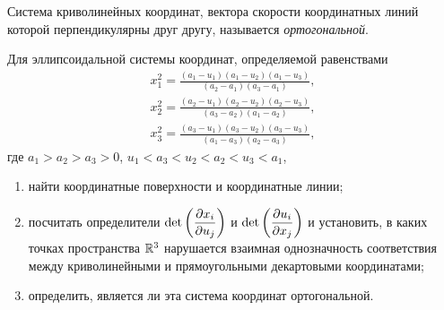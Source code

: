 \begin{definition}
	Система криволинейных координат, вектора скорости координатных линий которой перпендикулярны друг другу, называется \textit{ортогональной}.
\end{definition}

\begin{problem}
	Для эллипсоидальной системы координат, определяемой равенствами
	\begin{gather*}
		x_1^2 = \frac{(a_1 - u_1)(a_1 - u_2)(a_1 - u_3)}{(a_2 - a_1)(a_3 - a_1)},\\
		x_2^2 = \frac{(a_2 - u_1)(a_2 - u_2)(a_2 - u_3)}{(a_3 - a_2)(a_1 - a_2)},\\
		x_3^2 = \frac{(a_3 - u_1)(a_3 - u_2)(a_3 - u_3)}{(a_1 - a_3)(a_2 - a_3)},
	\end{gather*}
	где $a_1 > a_2 > a_3 > 0$, $u_1 < a_3 < u_2 < a_2 < u_3 < a_1$,
	\begin{enumerate}[nolistsep, label=(\arabic*)]
		\item найти координатные поверхности и координатные линии;
		\item посчитать определители $\displaystyle\det\left(\frac{\partial x_i}{\partial u_j}\right)$ и $\displaystyle\det\left(\frac{\partial u_i}{\partial x_j}\right)$ и установить, в каких точках пространства $\mathbb{R}^3$ нарушается взаимная однозначность соответствия между криволинейными и прямоугольными декартовыми координатами;
		\item определить, является ли эта система координат ортогональной.
	\end{enumerate}
\end{problem}

